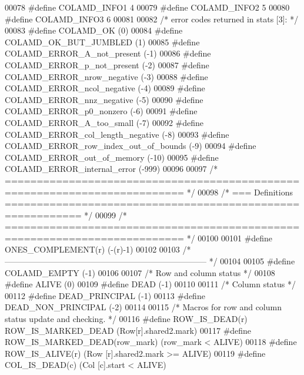 \begin{DoxyCode}
00078 \textcolor{preprocessor}{#define COLAMD\_INFO1 4}
00079 \textcolor{preprocessor}{#define COLAMD\_INFO2 5}
00080 \textcolor{preprocessor}{#define COLAMD\_INFO3 6}
00081 
00082 \textcolor{comment}{/* error codes returned in stats [3]: */}
00083 \textcolor{preprocessor}{#define COLAMD\_OK       (0)}
00084 \textcolor{preprocessor}{#define COLAMD\_OK\_BUT\_JUMBLED     (1)}
00085 \textcolor{preprocessor}{#define COLAMD\_ERROR\_A\_not\_present    (-1)}
00086 \textcolor{preprocessor}{#define COLAMD\_ERROR\_p\_not\_present    (-2)}
00087 \textcolor{preprocessor}{#define COLAMD\_ERROR\_nrow\_negative    (-3)}
00088 \textcolor{preprocessor}{#define COLAMD\_ERROR\_ncol\_negative    (-4)}
00089 \textcolor{preprocessor}{#define COLAMD\_ERROR\_nnz\_negative   (-5)}
00090 \textcolor{preprocessor}{#define COLAMD\_ERROR\_p0\_nonzero     (-6)}
00091 \textcolor{preprocessor}{#define COLAMD\_ERROR\_A\_too\_small    (-7)}
00092 \textcolor{preprocessor}{#define COLAMD\_ERROR\_col\_length\_negative  (-8)}
00093 \textcolor{preprocessor}{#define COLAMD\_ERROR\_row\_index\_out\_of\_bounds  (-9)}
00094 \textcolor{preprocessor}{#define COLAMD\_ERROR\_out\_of\_memory    (-10)}
00095 \textcolor{preprocessor}{#define COLAMD\_ERROR\_internal\_error   (-999)}
00096 
00097 \textcolor{comment}{/* ========================================================================== */}
00098 \textcolor{comment}{/* === Definitions ========================================================== */}
00099 \textcolor{comment}{/* ========================================================================== */}
00100 
00101 \textcolor{preprocessor}{#define ONES\_COMPLEMENT(r) (-(r)-1)}
00102 
00103 \textcolor{comment}{/* -------------------------------------------------------------------------- */}
00104 
00105 \textcolor{preprocessor}{#define COLAMD\_EMPTY (-1)}
00106 
00107 \textcolor{comment}{/* Row and column status */}
00108 \textcolor{preprocessor}{#define ALIVE (0)}
00109 \textcolor{preprocessor}{#define DEAD  (-1)}
00110 
00111 \textcolor{comment}{/* Column status */}
00112 \textcolor{preprocessor}{#define DEAD\_PRINCIPAL    (-1)}
00113 \textcolor{preprocessor}{#define DEAD\_NON\_PRINCIPAL  (-2)}
00114 
00115 \textcolor{comment}{/* Macros for row and column status update and checking. */}
00116 \textcolor{preprocessor}{#define ROW\_IS\_DEAD(r)      ROW\_IS\_MARKED\_DEAD (Row[r].shared2.mark)}
00117 \textcolor{preprocessor}{#define ROW\_IS\_MARKED\_DEAD(row\_mark)  (row\_mark < ALIVE)}
00118 \textcolor{preprocessor}{#define ROW\_IS\_ALIVE(r)     (Row [r].shared2.mark >= ALIVE)}
00119 \textcolor{preprocessor}{#define COL\_IS\_DEAD(c)      (Col [c].start < ALIVE)}

\end{DoxyCode}
